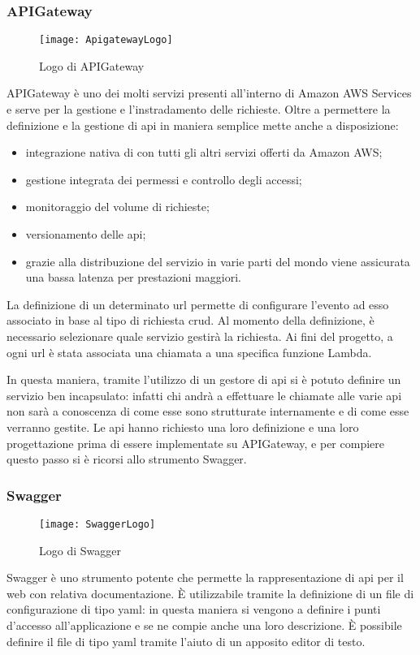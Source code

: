 \subsubsection{APIGateway}
\begin{figure}[H]
  \centering
  \texttt{[image: ApigatewayLogo]}
  \caption{Logo di APIGateway}
\end{figure}
APIGateway è uno dei molti servizi presenti all'interno di Amazon AWS Services
e serve per la gestione e l'instradamento delle richieste.
Oltre a permettere la definizione e la gestione di \gls{api} in maniera
semplice mette anche a disposizione:
\begin{itemize}
  \item integrazione nativa di con tutti gli altri servizi offerti da Amazon
AWS;
  \item gestione integrata dei permessi e controllo degli accessi;
  \item monitoraggio del volume di richieste;
  \item versionamento delle \gls{api};
  \item grazie alla distribuzione del servizio in varie parti del mondo viene
assicurata una bassa latenza per prestazioni maggiori.
\end{itemize}
La definizione di un determinato \gls{url} permette di configurare l'evento ad
esso associato in base al tipo di richiesta \gls{crud}. Al momento della
definizione, è necessario selezionare quale servizio gestirà la richiesta. Ai
fini del progetto, a ogni \gls{url} è stata associata una chiamata a una
specifica funzione Lambda.

In questa maniera, tramite l'utilizzo di un gestore di \gls{api} si è potuto
definire un servizio  ben incapsulato: infatti
chi andrà a effettuare le chiamate alle varie \gls{api} non sarà a conoscenza di
come esse sono strutturate internamente e di come esse verranno gestite.
Le \gls{api} hanno richiesto una loro definizione e una loro progettazione
prima di essere implementate su APIGateway, e per compiere questo passo si è
ricorsi allo strumento Swagger.


\subsubsection{Swagger}
\begin{figure}[H]
  \centering
  \texttt{[image: SwaggerLogo]}
  \caption{Logo di Swagger}
\end{figure}
Swagger è uno strumento potente che permette la rappresentazione di \gls{api}
per il web con relativa documentazione. È utilizzabile tramite la definizione
di un file di configurazione di tipo \gls{yaml}: in questa maniera si vengono a
definire i punti d'accesso all'applicazione e se ne compie anche una loro
descrizione. È possibile definire il file di tipo \gls{yaml} tramite l'aiuto di
un apposito editor di testo.

